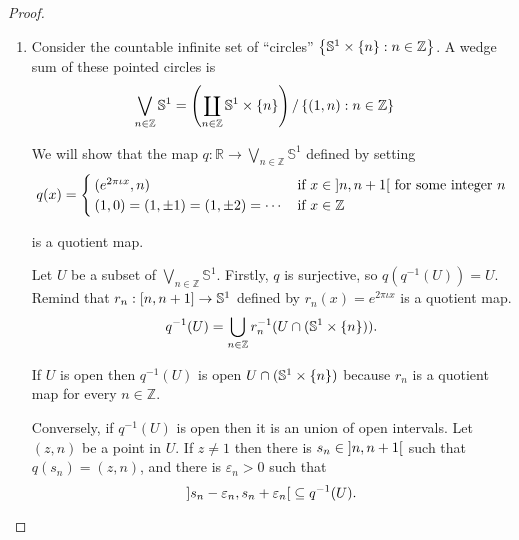 \begin{proof}
	\begin{enumerate}[label={(\alph*)}]
		\item Consider the countable infinite set of ``circles'' $\left\{{\mathbb{S}^{1}\times\left\{{n}\right\} : n\in \mathbb{Z}}\right\}$. A wedge sum of these pointed circles is
		      \begin{align*}
			      \bigvee_{n\in \mathbb{Z}}\mathbb{S}^{1} & = \left(\coprod_{n\in \mathbb{Z}} \mathbb{S}^{1}\times \left\{{n}\right\}\right) / \left\{{(1, n) : n\in \mathbb{Z}}\right\}
		      \end{align*}

		      We will show that the map $q: \mathbb{R} \to \bigvee_{n\in \mathbb{Z}}\mathbb{S}^{1}$ defined by setting
		      \begin{align*}
			      q(x) = \begin{cases}
				             (e^{2\pi\iota x}, n)                      & \text{if $x \in \left]{n, n+1}\right[$ for some integer $n$} \\
				             (1, 0) = (1, \pm 1) = (1, \pm 2) = \cdots & \text{if $x \in \mathbb{Z}$}
			             \end{cases}
		      \end{align*}

		      is a quotient map.

		      Let $U$ be a subset of $\bigvee_{n\in \mathbb{Z}}\mathbb{S}^{1}$. Firstly, $q$ is surjective, so $q(q^{-1}(U)) = U$. Remind that $r_{n}: \left[{n, n+1}\right]\to \mathbb{S}^{1}$ defined by $r_{n}(x) = e^{2\pi\iota x}$ is a quotient map.
		      \begin{equation*}
			      q^{-1}(U) = \bigcup_{n\in\mathbb{Z}}r_{n}^{-1}(U \cap (\mathbb{S}^{1}\times\left\{{n}\right\})).
		      \end{equation*}

		      If $U$ is open then $q^{-1}(U)$ is open $U \cap (\mathbb{S}^{1}\times\left\{{n}\right\})$ because $r_{n}$ is a quotient map for every $n\in\mathbb{Z}$.

		      Conversely, if $q^{-1}(U)$ is open then it is an union of open intervals. Let $(z, n)$ be a point in $U$. If $z\ne 1$ then there is $s_{n} \in \left]{n, n+1}\right[$ such that $q(s_{n}) = (z, n)$, and there is $\varepsilon_{n} > 0$ such that
		      \begin{equation*}
			      \left]{s_{n} - \varepsilon_{n}, s_{n} + \varepsilon_{n}}\right[ \subseteq q^{-1}(U).
		      \end{equation*}


\end{enumerate}
\end{proof}
